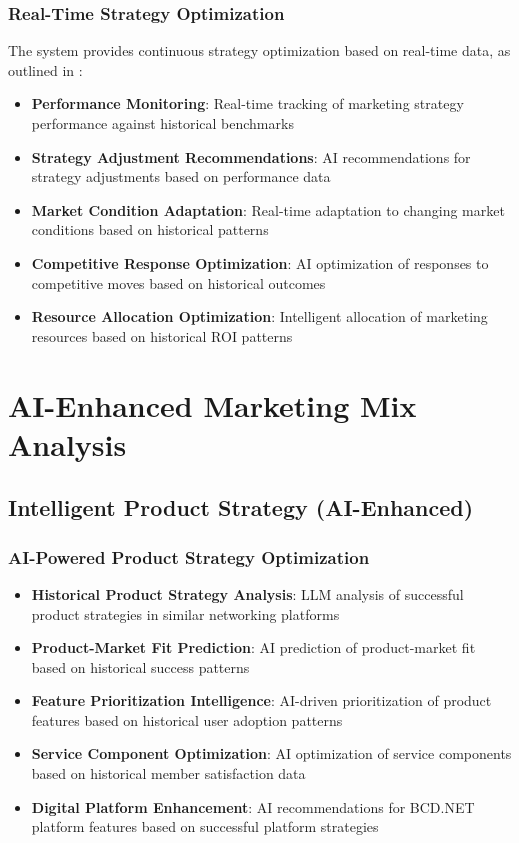 \subsubsection{Real-Time Strategy Optimization}

The system provides continuous strategy optimization based on real-time data, as outlined in \citep{jia_aidriven_audience_development}:

\begin{itemize}
    \item \textbf{Performance Monitoring}: Real-time tracking of marketing strategy performance against historical benchmarks
    \item \textbf{Strategy Adjustment Recommendations}: AI recommendations for strategy adjustments based on performance data
    \item \textbf{Market Condition Adaptation}: Real-time adaptation to changing market conditions based on historical patterns
    \item \textbf{Competitive Response Optimization}: AI optimization of responses to competitive moves based on historical outcomes
    \item \textbf{Resource Allocation Optimization}: Intelligent allocation of marketing resources based on historical ROI patterns
\end{itemize}

\section{AI-Enhanced Marketing Mix Analysis}

\subsection{Intelligent Product Strategy (AI-Enhanced)}

\subsubsection{AI-Powered Product Strategy Optimization}

\begin{itemize}
    \item \textbf{Historical Product Strategy Analysis}: LLM analysis of successful product strategies in similar networking platforms
    \item \textbf{Product-Market Fit Prediction}: AI prediction of product-market fit based on historical success patterns
    \item \textbf{Feature Prioritization Intelligence}: AI-driven prioritization of product features based on historical user adoption patterns
    \item \textbf{Service Component Optimization}: AI optimization of service components based on historical member satisfaction data
    \item \textbf{Digital Platform Enhancement}: AI recommendations for BCD.NET platform features based on successful platform strategies
\end{itemize}

